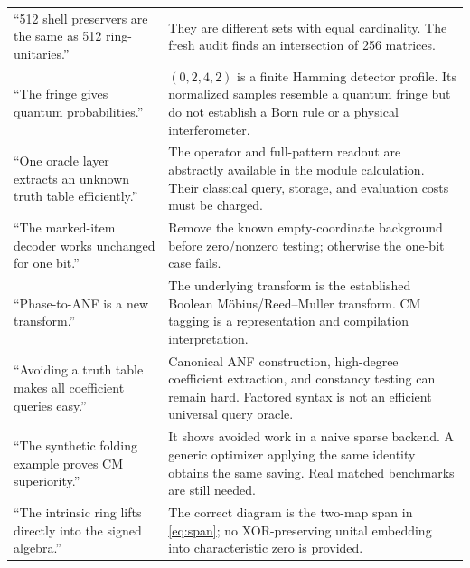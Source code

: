 \begin{longtable}{@{}L{0.31\textwidth}L{0.63\textwidth}@{}}
``512 shell preservers are the same as 512 ring-unitaries.'' & They are different sets with equal cardinality. The fresh audit finds an intersection of 256 matrices.\\
``The fringe gives quantum probabilities.'' & $(0,2,4,2)$ is a finite Hamming detector profile. Its normalized samples resemble a quantum fringe but do not establish a Born rule or a physical interferometer.\\
``One oracle layer extracts an unknown truth table efficiently.'' & The operator and full-pattern readout are abstractly available in the module calculation. Their classical query, storage, and evaluation costs must be charged.\\
``The marked-item decoder works unchanged for one bit.'' & Remove the known empty-coordinate background before zero/nonzero testing; otherwise the one-bit case fails.\\
``Phase-to-ANF is a new transform.'' & The underlying transform is the established Boolean M\"obius/Reed--Muller transform. CM tagging is a representation and compilation interpretation.\\
``Avoiding a truth table makes all coefficient queries easy.'' & Canonical ANF construction, high-degree coefficient extraction, and constancy testing can remain hard. Factored syntax is not an efficient universal query oracle.\\
``The synthetic folding example proves CM superiority.'' & It shows avoided work in a naive sparse backend. A generic optimizer applying the same identity obtains the same saving. Real matched benchmarks are still needed.\\
``The intrinsic ring lifts directly into the signed algebra.'' & The correct diagram is the two-map span in \cref{eq:span}; no XOR-preserving unital embedding into characteristic zero is provided.\\\bottomrule
\end{longtable}

